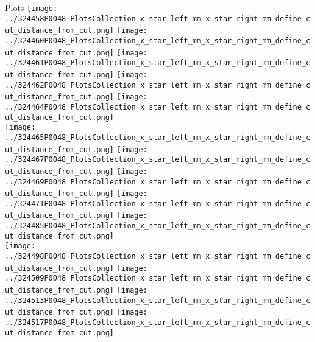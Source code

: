 \documentclass{beamer}
\begin{document}
\begin{frame}\tiny
        \begin{block}{Plots}
		  \centering
                \texttt{[image: ../324458P0048\_PlotsCollection\_x\_star\_left\_mm\_x\_star\_right\_mm\_define\_cut\_distance\_from\_cut.png]}
                \texttt{[image: ../324460P0048\_PlotsCollection\_x\_star\_left\_mm\_x\_star\_right\_mm\_define\_cut\_distance\_from\_cut.png]}
                \texttt{[image: ../324461P0048\_PlotsCollection\_x\_star\_left\_mm\_x\_star\_right\_mm\_define\_cut\_distance\_from\_cut.png]}
                \texttt{[image: ../324462P0048\_PlotsCollection\_x\_star\_left\_mm\_x\_star\_right\_mm\_define\_cut\_distance\_from\_cut.png]}
                \texttt{[image: ../324464P0048\_PlotsCollection\_x\_star\_left\_mm\_x\_star\_right\_mm\_define\_cut\_distance\_from\_cut.png]}\\
                \texttt{[image: ../324465P0048\_PlotsCollection\_x\_star\_left\_mm\_x\_star\_right\_mm\_define\_cut\_distance\_from\_cut.png]}
                \texttt{[image: ../324467P0048\_PlotsCollection\_x\_star\_left\_mm\_x\_star\_right\_mm\_define\_cut\_distance\_from\_cut.png]}
                \texttt{[image: ../324469P0048\_PlotsCollection\_x\_star\_left\_mm\_x\_star\_right\_mm\_define\_cut\_distance\_from\_cut.png]}
                \texttt{[image: ../324471P0048\_PlotsCollection\_x\_star\_left\_mm\_x\_star\_right\_mm\_define\_cut\_distance\_from\_cut.png]}
                \texttt{[image: ../324485P0048\_PlotsCollection\_x\_star\_left\_mm\_x\_star\_right\_mm\_define\_cut\_distance\_from\_cut.png]}\\
                \texttt{[image: ../324498P0048\_PlotsCollection\_x\_star\_left\_mm\_x\_star\_right\_mm\_define\_cut\_distance\_from\_cut.png]}
                \texttt{[image: ../324509P0048\_PlotsCollection\_x\_star\_left\_mm\_x\_star\_right\_mm\_define\_cut\_distance\_from\_cut.png]}
                \texttt{[image: ../324513P0048\_PlotsCollection\_x\_star\_left\_mm\_x\_star\_right\_mm\_define\_cut\_distance\_from\_cut.png]}
                \texttt{[image: ../324517P0048\_PlotsCollection\_x\_star\_left\_mm\_x\_star\_right\_mm\_define\_cut\_distance\_from\_cut.png]}

\end{block}
\end{frame}
\end{document}
